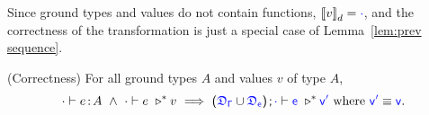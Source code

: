 Since ground types and values do not contain functions, $\bbracket{v}_d = \target{\cdot}$, and the correctness of the transformation is just a special case of Lemma~\ref{lem:prev sequence}.

\begin{coro}(Correctness) For all ground types $A$ and values $v$ of type $A$,
\begin{equation*}
	\cdot \vdash e \goodcolon A \ \land \
	\cdot \vdash e\ \triangleright^* v\ \Longrightarrow\ 
	\sfpl \target{\fdef_{\Gamma}} \cup \target{\fdef_{e}} \sfpr \semicolon \target{\cdot} \vdash \target{e}\ \triangleright^* \target{v'} \text{ where } \target{v'} \equiv \target{v}.
\end{equation*}
\end{coro}

